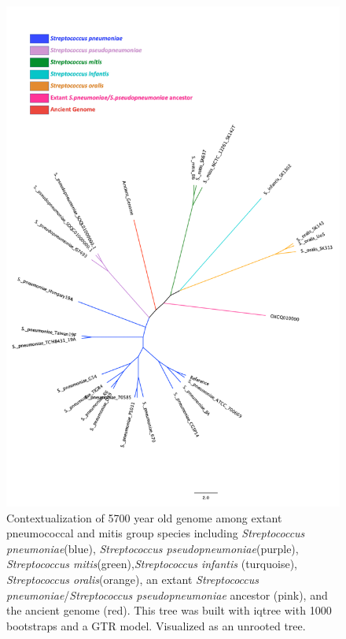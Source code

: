 \documentclass{article}
\begin{document}
\begin{figure}[H]
\centering
    \includegraphics[width=\textwidth]{newMRCA.pdf}
    \caption{Contextualization of 5700 year old genome among extant pneumococcal and mitis group species including \textit{Streptococcus pneumoniae}(blue), \textit{Streptococcus pseudopneumoniae}(purple), \textit{Streptococcus mitis}(green),\textit{Streptococcus infantis} (turquoise), \textit{Streptococcus oralis}(orange), an extant \textit{Streptococcus pneumoniae}/\textit{Streptococcus pseudopneumoniae} ancestor (pink), and the ancient genome (red). This tree was built with iqtree with 1000 bootstraps and a GTR model. Visualized as an unrooted tree.}
      \label{fig:extantancient}
\end{figure}
\end{document}
